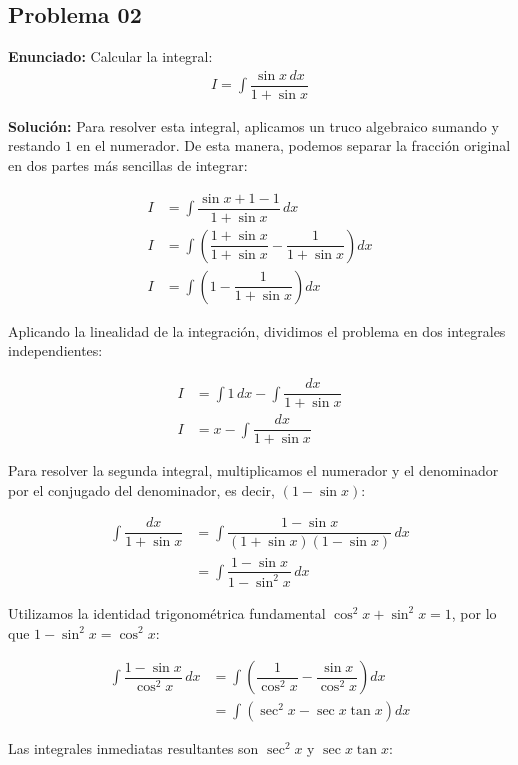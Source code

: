 \subsection*{Problema 02}

\textbf{Enunciado:} Calcular la integral:
\begin{align*}
I = \int \dfrac{\sin x \, dx}{1 + \sin x}
\end{align*}

\textbf{Solución:} Para resolver esta integral, aplicamos un truco algebraico sumando y restando $1$ en el numerador. De esta manera, podemos separar la fracción original en dos partes más sencillas de integrar:

\begin{align*}
I &= \int \dfrac{\sin x + 1 - 1}{1 + \sin x} \, dx \\
I &= \int \left( \dfrac{1 + \sin x}{1 + \sin x} - \dfrac{1}{1 + \sin x} \right) dx \\
I &= \int \left( 1 - \dfrac{1}{1 + \sin x} \right) dx
\end{align*}

Aplicando la linealidad de la integración, dividimos el problema en dos integrales independientes:

\begin{align*}
I &= \int 1 \, dx - \int \dfrac{dx}{1 + \sin x} \\
I &= x - \int \dfrac{dx}{1 + \sin x}
\end{align*}

Para resolver la segunda integral, multiplicamos el numerador y el denominador por el conjugado del denominador, es decir, $(1 - \sin x)$:

\begin{align*}
\int \dfrac{dx}{1 + \sin x} &= \int \dfrac{1 - \sin x}{(1 + \sin x)(1 - \sin x)} \, dx \\
&= \int \dfrac{1 - \sin x}{1 - \sin^2 x} \, dx
\end{align*}

Utilizamos la identidad trigonométrica fundamental $\cos^2 x + \sin^2 x = 1$, por lo que $1 - \sin^2 x = \cos^2 x$:

\begin{align*}
\int \dfrac{1 - \sin x}{\cos^2 x} \, dx &= \int \left( \dfrac{1}{\cos^2 x} - \dfrac{\sin x}{\cos^2 x} \right) dx \\
&= \int \left( \sec^2 x - \sec x \tan x \right) dx
\end{align*}

Las integrales inmediatas resultantes son $\sec^2 x$ y $\sec x \tan x$:

